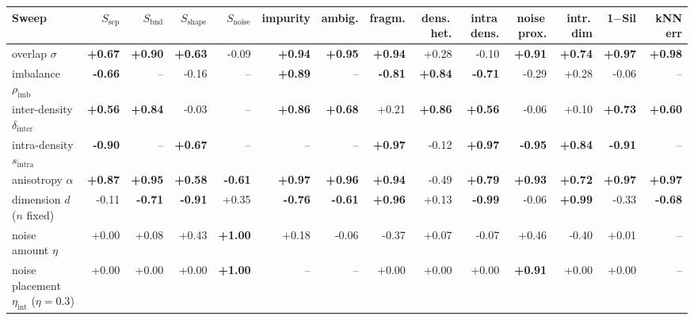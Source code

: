 \begin{tabular}{@{}lrrrrrrrrrrrrr@{}}
\toprule
Sweep & $S_{\text{sep}}$ & $S_{\text{bnd}}$ & $S_{\text{shape}}$ & $S_{\text{noise}}$ & impurity & ambig. & fragm. & dens.\,het. & intra\,dens. & noise\,prox. & intr.\,dim & 1$-$Sil & kNN err \\
\midrule
overlap $\sigma$ & \textbf{+0.67} & \textbf{+0.90} & \textbf{+0.63} & -0.09 & \textbf{+0.94} & \textbf{+0.95} & \textbf{+0.94} & +0.28 & -0.10 & \textbf{+0.91} & \textbf{+0.74} & \textbf{+0.97} & \textbf{+0.98} \\
imbalance $\rho_{\text{imb}}$ & \textbf{-0.66} & -- & -0.16 & -- & \textbf{+0.89} & -- & \textbf{-0.81} & \textbf{+0.84} & \textbf{-0.71} & -0.29 & +0.28 & -0.06 & -- \\
inter-density $\delta_{\text{inter}}$ & \textbf{+0.56} & \textbf{+0.84} & -0.03 & -- & \textbf{+0.86} & \textbf{+0.68} & +0.21 & \textbf{+0.86} & \textbf{+0.56} & -0.06 & +0.10 & \textbf{+0.73} & \textbf{+0.60} \\
intra-density $s_{\text{intra}}$ & \textbf{-0.90} & -- & \textbf{+0.67} & -- & -- & -- & \textbf{+0.97} & -0.12 & \textbf{+0.97} & \textbf{-0.95} & \textbf{+0.84} & \textbf{-0.91} & -- \\
anisotropy $\alpha$ & \textbf{+0.87} & \textbf{+0.95} & \textbf{+0.58} & \textbf{-0.61} & \textbf{+0.97} & \textbf{+0.96} & \textbf{+0.94} & -0.49 & \textbf{+0.79} & \textbf{+0.93} & \textbf{+0.72} & \textbf{+0.97} & \textbf{+0.97} \\
dimension $d$ ($n$ fixed) & -0.11 & \textbf{-0.71} & \textbf{-0.91} & +0.35 & \textbf{-0.76} & \textbf{-0.61} & \textbf{+0.96} & +0.13 & \textbf{-0.99} & -0.06 & \textbf{+0.99} & -0.33 & \textbf{-0.68} \\
noise amount $\eta$ & +0.00 & +0.08 & +0.43 & \textbf{+1.00} & +0.18 & -0.06 & -0.37 & +0.07 & -0.07 & +0.46 & -0.40 & +0.01 & -- \\
noise placement $\eta_{\text{int}}$ ($\eta = 0.3$) & +0.00 & +0.00 & +0.00 & \textbf{+1.00} & -- & -- & +0.00 & +0.00 & +0.00 & \textbf{+0.91} & +0.00 & +0.00 & -- \\
\bottomrule
\end{tabular}
